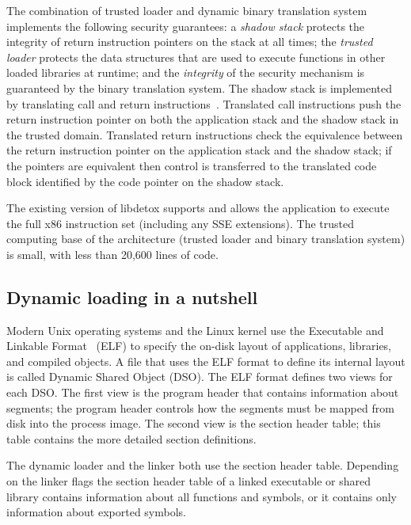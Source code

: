 \documentclass{acm_proc_article-sp}
\begin{document}
The combination of trusted loader and dynamic binary translation system
implements the following security guarantees: a \emph{shadow stack} protects the
integrity of return instruction pointers on the stack at all times; the
\emph{trusted loader} protects the data structures that are used to execute
functions in other loaded libraries at runtime; and the \emph{integrity} of the
security mechanism is guaranteed by the binary translation system. 
The shadow stack is implemented by translating call and return
instructions~\cite{libdetox}. Translated call instructions push the return
instruction pointer on both the application stack and the shadow stack in the
trusted domain. Translated return instructions check the equivalence between the
return instruction pointer on the application stack and the shadow stack; if the
pointers are equivalent then control is transferred to the translated code block
identified by the code pointer on the shadow stack.

The existing version of libdetox supports and allows the application to execute
the full x86 instruction set (including any SSE extensions). The trusted
computing base of the architecture (trusted loader and binary translation
system) is small, with less than 20,600 lines of code.


\subsection{Dynamic loading in a nutshell}


Modern Unix operating systems and the Linux kernel use the Executable and
Linkable Format~\cite{sysVABI,dreppersharedlibs} (ELF) to specify the on-disk
layout of applications, libraries, and compiled objects. A file that uses the
ELF format to define its internal layout is called Dynamic Shared Object
(DSO). The ELF format defines two views for each DSO. The first view is the
program header that contains information about segments; the program header
controls how the segments must be mapped from disk into the process image. The
second view is the section header table; this table contains the more detailed
section definitions.

The dynamic loader and the linker both use the section header table. Depending
on the linker flags the section header table of a linked executable or shared
library contains information about all functions and symbols, or it contains
only information about exported symbols.
\end{document}
